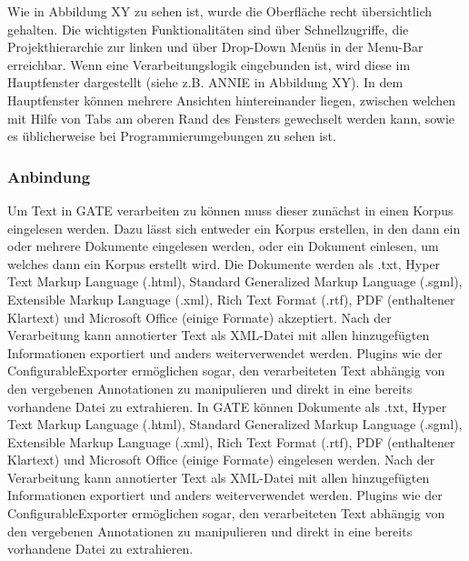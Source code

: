\documentclass[12pt]{report}
\begin{document}
Wie in Abbildung XY zu sehen ist, wurde die Oberfläche recht übersichtlich gehalten. Die wichtigsten Funktionalitäten sind über Schnellzugriffe, die Projekthierarchie zur linken und über Drop-Down Menüs in der Menu-Bar erreichbar. Wenn eine Verarbeitungslogik eingebunden ist, wird diese im Hauptfenster dargestellt (siehe z.B. ANNIE in Abbildung XY). In dem Hauptfenster können mehrere Ansichten hintereinander liegen, zwischen welchen mit Hilfe von Tabs am oberen Rand des Fensters gewechselt werden kann, sowie es üblicherweise bei Programmierumgebungen zu sehen ist. 

\subsubsection{Anbindung}

Um Text in GATE verarbeiten zu können muss dieser zunächst in einen Korpus eingelesen werden. Dazu lässt sich entweder ein Korpus erstellen, in den dann ein oder mehrere Dokumente eingelesen werden, oder ein Dokument einlesen, um welches dann ein Korpus erstellt wird. Die Dokumente werden als .txt, Hyper Text Markup Language (.html), Standard Generalized Markup Language (.sgml), Extensible Markup Language (.xml), Rich Text Format (.rtf), PDF (enthaltener Klartext) und Microsoft Office (einige Formate) akzeptiert.
Nach der Verarbeitung kann annotierter Text als XML-Datei mit allen hinzugefügten Informationen exportiert und anders weiterverwendet werden. Plugins wie der ConfigurableExporter ermöglichen sogar, den verarbeiteten Text abhängig von den vergebenen Annotationen zu manipulieren und direkt in eine bereits vorhandene Datei zu extrahieren. 
In GATE können Dokumente als .txt, Hyper Text Markup Language (.html), Standard Generalized Markup Language (.sgml), Extensible Markup Language (.xml), Rich Text Format (.rtf), PDF (enthaltener Klartext) und Microsoft Office (einige Formate) eingelesen werden.
Nach der Verarbeitung kann annotierter Text als XML-Datei mit allen hinzugefügten Informationen exportiert und anders weiterverwendet werden. Plugins wie der ConfigurableExporter ermöglichen sogar, den verarbeiteten Text abhängig von den vergebenen Annotationen zu manipulieren und direkt in eine bereits vorhandene Datei zu extrahieren.\\
\end{document}
